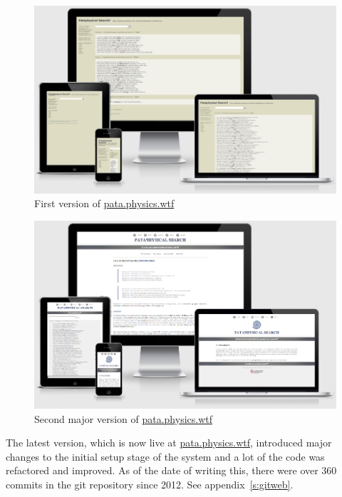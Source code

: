 \begin{figure}[!htbp] %
  \centering
  \includegraphics[width=\linewidth]{images/proto1screen}
\caption[First version of \url{pata.physics.wtf}]{First version of \url{pata.physics.wtf}}
\label{img:proto1screen}
\end{figure}

\begin{figure}[!htbp] %
  \centering
  \includegraphics[width=\linewidth]{images/proto2screen}
\caption[Second major version of \url{pata.physics.wtf}]{Second major version of \url{pata.physics.wtf}}
\label{img:proto2screen}
\end{figure}

The latest version, which is now live at \url{pata.physics.wtf}, introduced major changes to the initial setup stage of the system and a lot of the code was refactored and improved. As of the date of writing this, there were over 360 commits in the git repository since 2012. See appendix~\ref{s:gitweb}.


\stopcontents[chapters]

